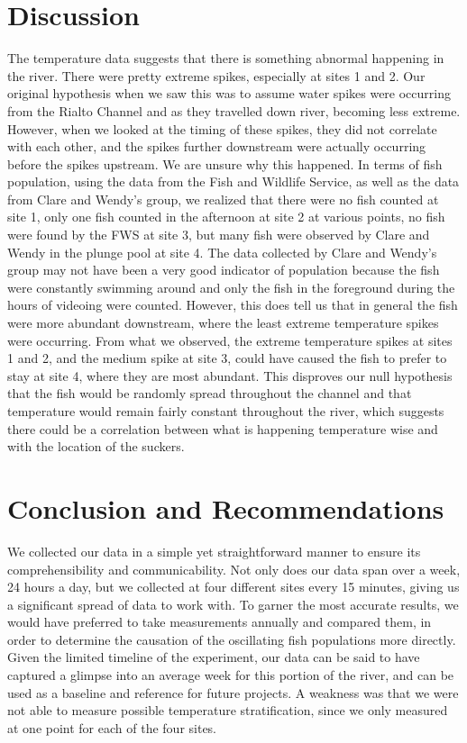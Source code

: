 \documentclass{article}
\begin{document}
\section{Discussion}
The temperature data suggests that there is something abnormal happening in the river. There were pretty extreme spikes, especially at sites 1 and 2. Our original hypothesis when we saw this was to assume water spikes were occurring from the Rialto Channel and as they travelled down river, becoming less extreme. However, when we looked at the timing of these spikes, they did not correlate with each other, and the spikes further downstream were actually occurring before the spikes upstream. We are unsure why this happened. In terms of fish population, using the data from the Fish and Wildlife Service, as well as the data from Clare and Wendy's group, we realized that there were no fish counted at site 1, only one fish counted in the afternoon at site 2 at various points, no fish were found by the FWS at site 3, but many fish were observed by Clare and Wendy in the plunge pool at site 4. The data collected by Clare and Wendy’s group may not have been a very good indicator of population because the fish were constantly swimming around and only the fish in the foreground during the hours of videoing were counted. However, this does tell us that in general the fish were more abundant downstream, where the least extreme temperature spikes were occurring. From what we observed, the extreme temperature spikes at sites 1 and 2, and the medium spike at site 3, could have caused the fish to prefer to stay at site 4, where they are most abundant. This disproves our null hypothesis that the fish would be randomly spread throughout the channel and that temperature would remain fairly constant throughout the river, which suggests there could be a correlation between what is happening temperature wise and with the location of the suckers.


\section{Conclusion and Recommendations}
We collected our data in a simple yet straightforward manner to ensure its comprehensibility and communicability. Not only does our data span over a week, 24 hours a day, but we collected at four different sites every 15 minutes, giving us a significant spread of data to work with. To garner the most accurate results, we would have preferred to take measurements annually and compared them, in order to determine the causation of the oscillating fish populations more directly.  Given the limited timeline of the experiment, our data can be said to have captured a glimpse into an average week for this portion of the river, and can be used as a baseline and reference for future projects. A weakness was that we were not able to measure possible temperature stratification, since we only measured at one point for each of the four sites. 
\end{document}
